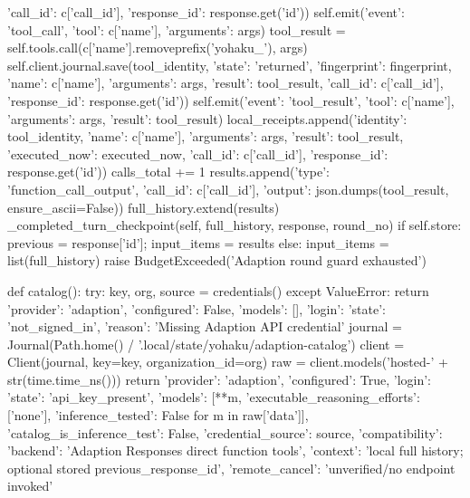 {{                                                                 'call_id': c['call_id'], 'response_id': response.get('id')})
                        self.emit({'event': 'tool_call', 'tool': c['name'], 'arguments': args})
                        tool_result = self.tools.call(c['name'].removeprefix('yohaku_'), args)
                        self.client.journal.save(tool_identity, {'state': 'returned', 'fingerprint': fingerprint,
                                                                 'name': c['name'], 'arguments': args,
                                                                 'result': tool_result, 'call_id': c['call_id'],
                                                                 'response_id': response.get('id')})
                        self.emit({'event': 'tool_result', 'tool': c['name'], 'arguments': args, 'result': tool_result})
                local_receipts.append({'identity': tool_identity, 'name': c['name'], 'arguments': args,
                                       'result': tool_result, 'executed_now': executed_now,
                                       'call_id': c['call_id'], 'response_id': response.get('id')})
                calls_total += 1
                results.append({'type': 'function_call_output', 'call_id': c['call_id'],
                                'output': json.dumps(tool_result, ensure_ascii=False)})
            full_history.extend(results)
            _completed_turn_checkpoint(self, full_history, response, round_no)
            if self.store:
                previous = response['id']; input_items = results
            else:
                input_items = list(full_history)
        raise BudgetExceeded('Adaption round guard exhausted')


def catalog():
    try:
        key, org, source = credentials()
    except ValueError:
        return {'provider': 'adaption', 'configured': False, 'models': [],
                'login': {'state': 'not_signed_in'}, 'reason': 'Missing Adaption API credential'}
    journal = Journal(Path.home() / '.local/state/yohaku/adaption-catalog')
    client = Client(journal, key=key, organization_id=org)
    raw = client.models('hosted-' + str(time.time_ns()))
    return {'provider': 'adaption', 'configured': True, 'login': {'state': 'api_key_present'},
            'models': [{**m, 'executable_reasoning_efforts': ['none'],
                        'inference_tested': False} for m in raw['data']],
            'catalog_is_inference_test': False, 'credential_source': source,
            'compatibility': {'backend': 'Adaption Responses direct function tools',
                              'context': 'local full history; optional stored previous_response_id',
                              'remote_cancel': 'unverified/no endpoint invoked'}}


}
